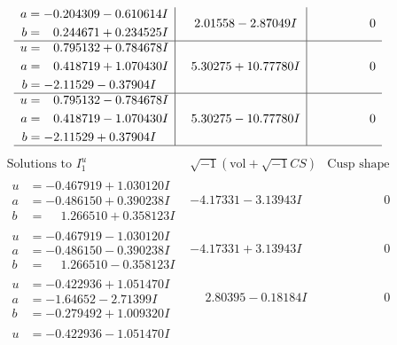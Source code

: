 \documentclass[1p]{elsarticle_modified}
\theoremstyle{definition}
\newcommand{\I}{\sqrt{-1}}
\begin{document}
$$\begin{array}{c|c|c}
\begin{aligned}
a &= -0.204309 - 0.610614 I \\
b &= \phantom{-}0.244671 + 0.234525 I\end{aligned}
 & \phantom{-}2.01558 - 2.87049 I & \phantom{-0.000000 } 0 \\ \hline\begin{aligned}
u &= \phantom{-}0.795132 + 0.784678 I \\
a &= \phantom{-}0.418719 + 1.070430 I \\
b &= -2.11529 - 0.37904 I\end{aligned}
 & \phantom{-}5.30275 + 10.77780 I & \phantom{-0.000000 } 0 \\ \hline\begin{aligned}
u &= \phantom{-}0.795132 - 0.784678 I \\
a &= \phantom{-}0.418719 - 1.070430 I \\
b &= -2.11529 + 0.37904 I\end{aligned}
 & \phantom{-}5.30275 - 10.77780 I & \phantom{-0.000000 } 0\\
 \hline 
 \end{array}$$\newpage$$\begin{array}{c|c|c}  
\text{Solutions to }I^u_{1}& \I (\text{vol} + \sqrt{-1}CS) & \text{Cusp shape}\\
 \hline 
\begin{aligned}
u &= -0.467919 + 1.030120 I \\
a &= -0.486150 + 0.390238 I \\
b &= \phantom{-}1.266510 + 0.358123 I\end{aligned}
 & -4.17331 - 3.13943 I & \phantom{-0.000000 } 0 \\ \hline\begin{aligned}
u &= -0.467919 - 1.030120 I \\
a &= -0.486150 - 0.390238 I \\
b &= \phantom{-}1.266510 - 0.358123 I\end{aligned}
 & -4.17331 + 3.13943 I & \phantom{-0.000000 } 0 \\ \hline\begin{aligned}
u &= -0.422936 + 1.051470 I \\
a &= -1.64652 - 2.71399 I \\
b &= -0.279492 + 1.009320 I\end{aligned}
 & \phantom{-}2.80395 - 0.18184 I & \phantom{-0.000000 } 0 \\ \hline\begin{aligned}
u &= -0.422936 - 1.051470 I \\

\end{aligned}
\end{array}$$
\end{document}
